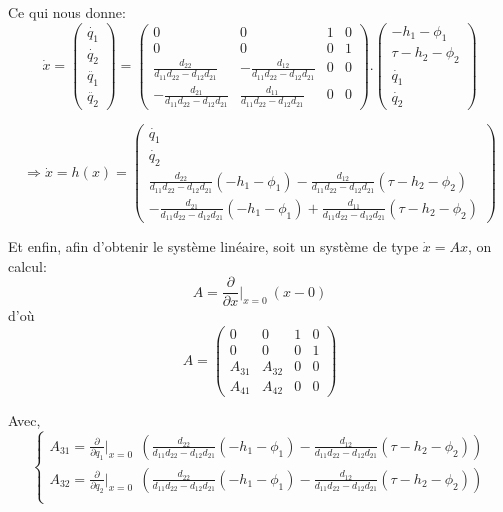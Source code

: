 \documentclass[a4paper,12pt]{report}
\begin{document}
Ce qui nous donne:
$$
    \dot{x}
    =
    \begin{pmatrix}
    \dot{q_1} \\
    \dot{q_2} \\
    \ddot{q_1} \\
    \ddot{q_2}
    \end{pmatrix}
    =
    \begin{pmatrix}
    0 & 0 & 1 & 0 \\
    0 & 0 & 0 & 1 \\
    \frac{d_{22}}{d_{11}d_{22} - d_{12}d_{21}} & -\frac{d_{12}}{d_{11}d_{22} - d_{12}d_{21}} & 0 & 0 \\
    -\frac{d_{21}}{d_{11}d_{22} - d_{12}d_{21}} & \frac{d_{11}}{d_{11}d_{22} - d_{12}d_{21}} & 0 & 0
    \end{pmatrix}
    .
    \begin{pmatrix}
    -h_1 - \phi_1 \\
    \tau -h_2 - \phi_2 \\
    \dot{q_1} \\
    \dot{q_2}
    \end{pmatrix}
$$

$$
    \Rightarrow
    \dot{x}
    =
    h(x)
    =
    \begin{pmatrix}
    \dot{q_1} \\
    \dot{q_2} \\
    \frac{d_{22}}{d_{11}d_{22} - d_{12}d_{21}}(-h_1 - \phi_1) -\frac{d_{12}}{d_{11}d_{22} - d_{12}d_{21}}(\tau -h_2 - \phi_2) \\
    -\frac{d_{21}}{d_{11}d_{22} - d_{12}d_{21}}(-h_1 - \phi_1) +\frac{d_{11}}{d_{11}d_{22} - d_{12}d_{21}}(\tau -h_2 - \phi_2)     
    \end{pmatrix}
$$


Et enfin, afin d'obtenir le système linéaire, soit un système de type $\dot{x}=Ax$, on calcul:
$$A = \frac{\partial}{\partial{x}}|_{x=0} \ (x-0)$$
d'où 
$$
    A
    =
    \begin{pmatrix}
    0 & 0 & 1 & 0 \\
    0 & 0 & 0 & 1 \\
    A_{31} & A_{32} & 0 & 0 \\
    A_{41} & A_{42} & 0 & 0 
    \end{pmatrix}
$$

Avec,
$$
\left\{
    \begin{array}{ll}
        A_{31} = \frac{\partial}{\partial{q_1}}|_{x=0} \ \ (\frac{d_{22}}{d_{11}d_{22} - d_{12}d_{21}}(-h_1 - \phi_1) -\frac{d_{12}}{d_{11}d_{22} - d_{12}d_{21}}(\tau -h_2 - \phi_2))  \\
        A_{32} = \frac{\partial}{\partial{q_2}}|_{x=0} \ \ (\frac{d_{22}}{d_{11}d_{22} - d_{12}d_{21}}(-h_1 - \phi_1) -\frac{d_{12}}{d_{11}d_{22} - d_{12}d_{21}}(\tau -h_2 - \phi_2))  \\
    \end{array}
\right.
$$
\end{document}
